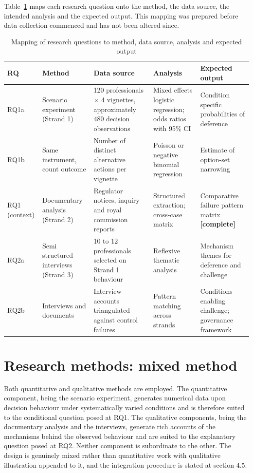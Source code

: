 \documentclass[12pt,a4paper]{article}
\begin{document}
Table~\ref{tab:matrix} maps each research question onto the method, the data source, the intended analysis
and the expected output. This mapping was prepared before data collection commenced and has not been
altered since.

\begin{table}[H]
\centering\footnotesize
\caption{Mapping of research questions to method, data source, analysis and expected output}
\label{tab:matrix}
\begin{tabularx}{\textwidth}{@{}p{1.2cm} p{2.3cm} X p{2.6cm} p{2.6cm}@{}}
\toprule
\textbf{RQ} & \textbf{Method} & \textbf{Data source} & \textbf{Analysis} & \textbf{Expected output} \\
\midrule
RQ1a & Scenario experiment (Strand 1) & 120 professionals $\times$ 4 vignettes, approximately 480 decision
observations & Mixed effects logistic regression; odds ratios with 95\% CI & Condition specific
probabilities of deference \\
RQ1b & Same instrument, count outcome & Number of distinct alternative actions per vignette & Poisson or
negative binomial regression & Estimate of option-set narrowing \\
RQ1 (context) & Documentary analysis (Strand 2) & Regulator notices, inquiry and royal commission reports &
Structured extraction; cross-case matrix & Comparative failure pattern matrix \textbf{[complete]} \\
RQ2a & Semi structured interviews (Strand 3) & 10 to 12 professionals selected on Strand 1 behaviour &
Reflexive thematic analysis & Mechanism themes for deference and challenge \\
RQ2b & Interviews and documents & Interview accounts triangulated against control failures & Pattern
matching across strands & Conditions enabling challenge; governance framework \\
\bottomrule
\end{tabularx}
\end{table}

\section{Research methods: mixed method}

Both quantitative and qualitative methods are employed. The quantitative component, being the
scenario experiment, generates numerical data upon decision behaviour under systematically varied
conditions and is therefore suited to the conditional question posed at RQ1. The qualitative
components, being the documentary analysis and the interviews, generate rich accounts of the
mechanisms behind the observed behaviour and are suited to the explanatory question posed at RQ2.
Neither component is subordinate to the other. The design is genuinely mixed rather than
quantitative work with qualitative illustration appended to it, and the integration procedure is
stated at section 4.5.
\end{document}
